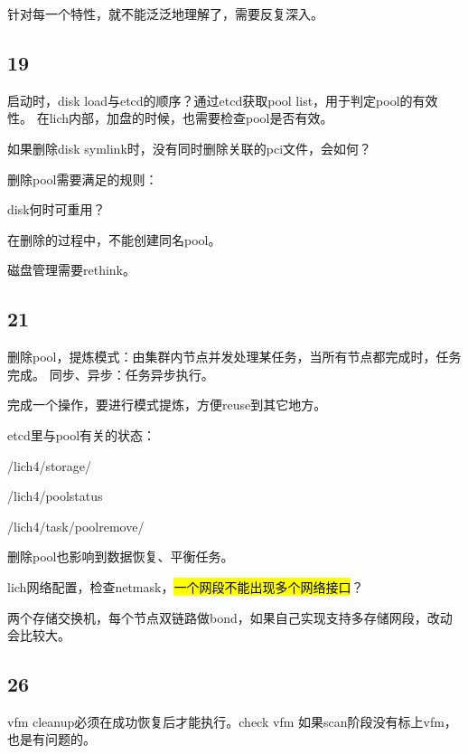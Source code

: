 针对每一个特性，就不能泛泛地理解了，需要反复深入。

\subsection{19}

启动时，disk load与etcd的顺序？通过etcd获取pool list，用于判定pool的有效性。
在lich内部，加盘的时候，也需要检查pool是否有效。

如果删除disk symlink时，没有同时删除关联的pci文件，会如何？

删除pool需要满足的规则：
\begin{enumbox}
\item disk何时可重用？
\item 在删除的过程中，不能创建同名pool。
\end{enumbox}

磁盘管理需要rethink。

\subsection{21}

删除pool，提炼模式：由集群内节点并发处理某任务，当所有节点都完成时，任务完成。
同步、异步：任务异步执行。

完成一个操作，要进行模式提炼，方便reuse到其它地方。

etcd里与pool有关的状态：
\begin{enumbox}
\item /lich4/storage/
\item /lich4/poolstatus
\item /lich4/task/poolremove/
\end{enumbox}

删除pool也影响到数据恢复、平衡任务。

lich网络配置，检查netmask，\hl{一个网段不能出现多个网络接口}？

两个存储交换机，每个节点双链路做bond，如果自己实现支持多存储网段，改动会比较大。

\subsection{26}

vfm cleanup必须在成功恢复后才能执行。check vfm
如果scan阶段没有标上vfm，也是有问题的。

